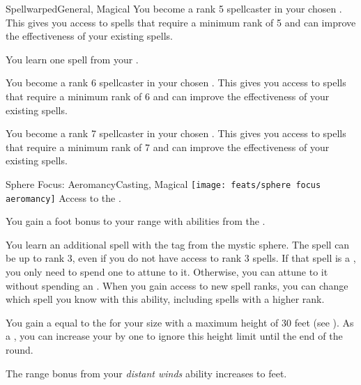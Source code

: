 \begin{magicalfeat}{Spellwarped}{General, Magical}
         You become a rank 5 spellcaster in your chosen .
        This gives you access to spells that require a minimum rank of 5 and can improve the effectiveness of your existing spells.

         You learn one spell from your .

         You become a rank 6 spellcaster in your chosen .
        This gives you access to spells that require a minimum rank of 6 and can improve the effectiveness of your existing spells.

         You become a rank 7 spellcaster in your chosen .
        This gives you access to spells that require a minimum rank of 7 and can improve the effectiveness of your existing spells.
    \end{magicalfeat}

    \begin{magicalfeat}{Sphere Focus: Aeromancy}{Casting, Magical}
        \texttt{[image: feats/sphere focus aeromancy]}
        \featpre Access to the  .

         You gain a  foot bonus to your range with abilities from the  .

         You learn an additional spell with the  tag from the  mystic sphere.
        The spell can be up to rank 3, even if you do not have access to rank 3 spells.
        If that spell is a , you only need to spend one  to attune to it.
        Otherwise, you can attune to it without spending an .
        When you gain access to new spell ranks, you can change which spell you know with this ability, including spells with a higher rank.

         You gain a  equal to the  for your size with a maximum height of 30 feet (see ).
        As a , you can increase your  by one to ignore this height limit until the end of the round.

         The range bonus from your \textit{distant winds} ability increases to  feet.
    \end{magicalfeat}

